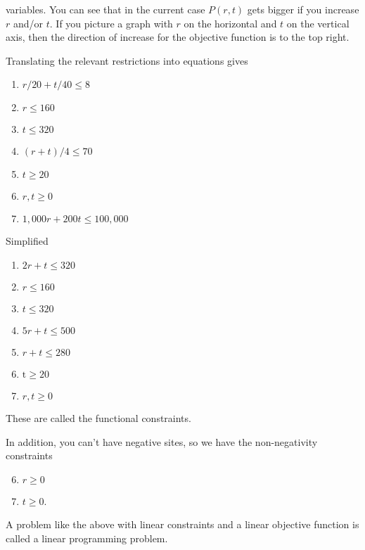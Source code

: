 variables. You can see that in the current case $P(r, t)$ gets bigger if you increase $r$ and/or $t$. If you picture a graph with $r$ on the horizontal and $t$ on the vertical axis, then the direction of increase for the objective function is to the top right.

Translating the relevant restrictions into equations gives

\begin{enumerate}
  \item $r / 20+t / 40 \leq 8$

  \item $r \leq 160$

  \item $t \leq 320$

  \item $(r+t) / 4 \leq 70$

  \item $t \geq 20$

  \item $r, t \geq 0$

  \item $1,000 r+200 t \leq 100,000$

\end{enumerate}
Simplified

\begin{enumerate}
  \item $2 r+t \leq 320$

  \item $r \leq 160$

  \item $t \leq 320$

  \item $5 r+t \leq 500$

  \item $r+t \leq 280$

  \item $\mathrm{t} \geq 20$

  \item $r, t \geq 0$

\end{enumerate}
These are called the functional constraints.

In addition, you can't have negative sites, so we have the non-negativity constraints

\begin{enumerate}
  \setcounter{enumi}{5}
  \item $r \geq 0$

  \item $t \geq 0$.

\end{enumerate}
A problem like the above with linear constraints and a linear objective function is called a linear programming problem.

